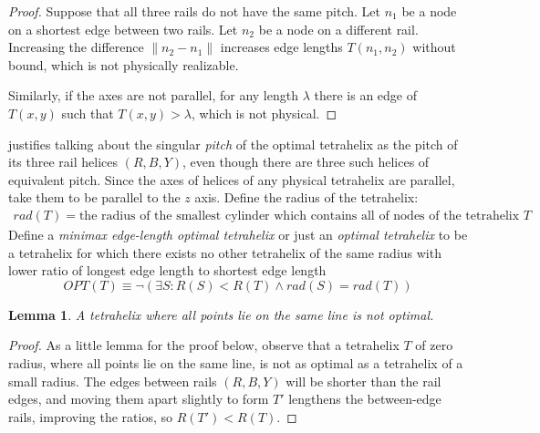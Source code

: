 \documentclass[10pt,final]{journals-1.0/asme2ej}
\newtheorem{lemma}{Lemma}
\begin{document}
\begin{proof}
Suppose that all three rails do not have the same pitch.
Let $n_1$ be a node on a  shortest edge between
two rails. Let $n_2$ be a node on a different rail.
Increasing the difference $\|n_2-n_1\|$ increases edge lengths $T(n_1,n_2)$
without bound,
which is not physically realizable.


Similarly, if the axes are not parallel, for any length $\lambda$ there is an edge of $T(x,y)$
such that $T(x,y) > \lambda$, which is not physical.

\end{proof}

 justifies talking about the singular
\emph{pitch} of 
the optimal tetrahelix as the pitch of its three rail helices $(R,B,Y)$, even though there are
three such helices of equivalent pitch.
Since the axes of helices of any physical tetrahelix are parallel, take
them to be parallel to the $z$ axis. Define the radius of the tetrahelix:
\begin{align*}
rad(T) = \text{the radius of the smallest cylinder which contains all of nodes of the tetrahelix } T
\end{align*}
Define a \emph{minimax edge-length optimal tetrahelix} or just an
\emph{optimal tetrahelix} to be a tetrahelix for which there exists
no other tetrahelix  of the same radius with lower ratio of longest edge length to
shortest edge length
\begin{equation}
  OPT(T) \equiv \neg (\exists S : R(S) < R(T) \wedge rad(S) = rad(T))
  \label{eq:optdef}
\end{equation}

\begin{lemma}
  A tetrahelix where all points lie on the same line is not optimal.
    \label{lemma:notpoint}
\end{lemma}
\begin{proof}
As a little lemma for the proof below, observe that a tetrahelix $T$ of zero radius, where
all points lie on the same line,
is not as optimal as a tetrahelix of a small radius. The edges between rails $(R,B,Y)$ will be
shorter than the rail edges, and moving them apart slightly to form $T'$ lengthens the between-edge
rails, improving the ratios, so $R(T') < R(T)$.
\end{proof}
\end{document}
